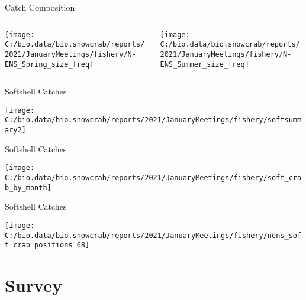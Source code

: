 \documentclass[
  ignorenonframetext,
]{beamer}
\begin{document}
\begin{frame}{Catch Composition}
\protect\hypertarget{catch-composition-1}{}
\begin{columns}[T]
\begin{column}{0.48\textwidth}
\begin{center}\texttt{[image: C:/bio.data/bio.snowcrab/reports/2021/JanuaryMeetings/fishery/N-ENS\_Spring\_size\_freq]} \end{center}
\end{column}

\begin{column}{0.48\textwidth}
\begin{center}\texttt{[image: C:/bio.data/bio.snowcrab/reports/2021/JanuaryMeetings/fishery/N-ENS\_Summer\_size\_freq]} \end{center}
\end{column}
\end{columns}
\end{frame}

\begin{frame}{Softshell Catches}
\protect\hypertarget{softshell-catches}{}
\begin{center}\texttt{[image: C:/bio.data/bio.snowcrab/reports/2021/JanuaryMeetings/fishery/softsummary2]} \end{center}
\end{frame}

\begin{frame}{Softshell Catches}
\protect\hypertarget{softshell-catches-1}{}
\begin{center}\texttt{[image: C:/bio.data/bio.snowcrab/reports/2021/JanuaryMeetings/fishery/soft\_crab\_by\_month]} \end{center}
\end{frame}

\begin{frame}{Softshell Catches}
\protect\hypertarget{softshell-catches-2}{}
\begin{center}\texttt{[image: C:/bio.data/bio.snowcrab/reports/2021/JanuaryMeetings/fishery/nens\_soft\_crab\_positions\_68]} \end{center}
\end{frame}

\hypertarget{survey}{%
\section{Survey}\label{survey}}
\end{document}
